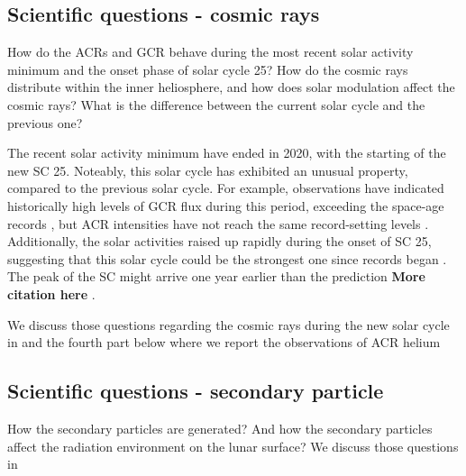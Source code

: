 
\subsection*{Scientific questions - cosmic rays}

How do the \acp{ACR} and \ac{GCR} behave during the most recent solar activity minimum and the onset phase of solar cycle 25? How do the cosmic rays distribute within the inner heliosphere, and how does solar modulation affect the cosmic rays? What is the difference between the current solar cycle and the previous one? 

The recent solar activity minimum have ended in 2020, with the starting of the new \ac{SC} 25. Noteably, this solar cycle has exhibited an unusual property, compared to the previous solar cycle. For example, observations have indicated historically high levels of \ac{GCR} flux during this period, exceeding the space-age records \citep{Fu2021ApJS, Xu2022FrASS}, but \ac{ACR} intensities have not reach the same record-setting levels \citet{Strauss2023ApJ}. 
Additionally, the solar activities raised up rapidly during the onset of \ac{SC} 25, suggesting that this solar cycle could be the strongest one since records began \citep{Nagovitsyn2023SoPh}. The peak of the \ac{SC} might arrive one year earlier than the prediction \textbf{More citation here} \citep{McIntosh2020SoPh}.

We discuss those questions regarding the cosmic rays during the new solar cycle in \citet{Xu2022FrASS,Mason-2021-SolOQuietTime} and the fourth part below where we report the observations of \ac{ACR} helium

\subsection*{Scientific questions - secondary particle}
How the secondary particles are generated? And how the secondary particles affect the radiation environment on the lunar surface? We discuss those questions in \citet{Xu2022FrASS}


